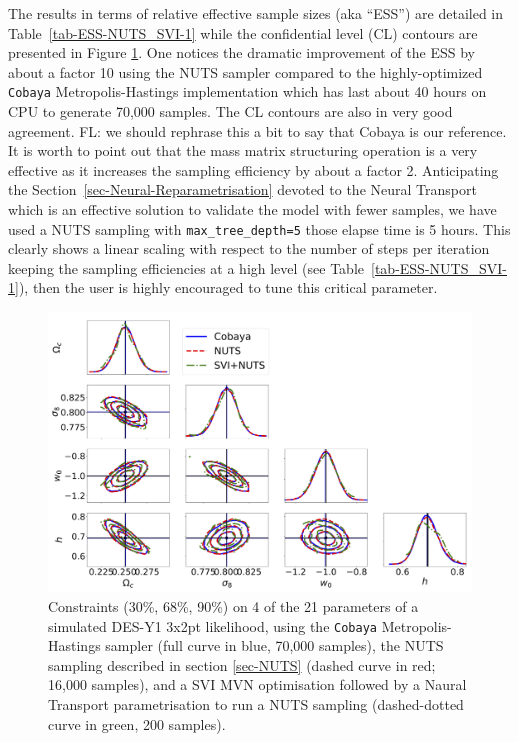 \documentclass[twocolumn,twocolappendix,nofootinbib,iop]{openjournal}
\newcommand{\FrL}[1]{{\color{cyan}FL: #1}}
\begin{document}
The results in terms of relative effective sample sizes (aka ``ESS'') are detailed in Table~\ref{tab-ESS-NUTS_SVI-1} while the confidential level (CL) contours are presented in Figure \ref{fig_cobaya_NUTS_SVI}. One notices the dramatic improvement of the ESS by about a factor 10 using the NUTS sampler compared to the highly-optimized \texttt{Cobaya} Metropolis-Hastings implementation \citep{2019ascl.soft10019T,2021JCAP...05..057T} which has last about 40 hours on CPU to generate 70,000 samples. The CL contours are also in very good agreement. \FrL{we should rephrase this a bit to say that Cobaya is our reference.} It is worth to point out that the mass matrix structuring operation is a very effective as it increases the sampling efficiency by about a factor 2.   Anticipating the Section~\ref{sec-Neural-Reparametrisation} devoted to the Neural Transport which is an effective solution to validate the model with fewer samples, we have used a NUTS sampling with \texttt{max\_tree\_depth=5} those elapse time is 5 hours. This clearly shows a linear scaling with respect to the number of steps per iteration keeping the sampling efficiencies at a high level (see Table~\ref{tab-ESS-NUTS_SVI-1}), then the user is highly encouraged to tune this critical parameter. 
%
\begin{figure}
\centering
\includegraphics[width=1.5\columnwidth]{figures/Cobaya-NUTS-SVI200.png}
\caption{Constraints (30\%, 68\%, 90\%) on 4 of the 21 parameters of a simulated DES-Y1 3x2pt likelihood, using the \texttt{Cobaya} Metropolis-Hastings sampler (full curve in blue, 70,000 samples), the  NUTS sampling described in section \ref{sec-NUTS} (dashed curve in red; 16,000 samples), and a SVI MVN optimisation followed by a Naural Transport parametrisation to run a NUTS sampling (dashed-dotted curve in green, 200 samples).}
\label{fig_cobaya_NUTS_SVI}
\end{figure}
\end{document}
